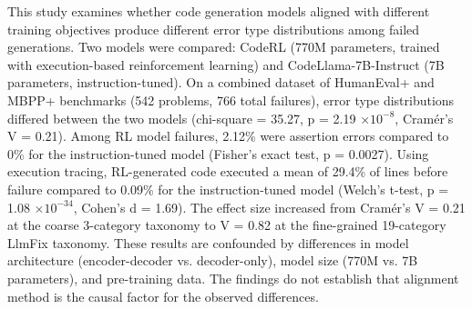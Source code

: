 
This study examines whether code generation models aligned with different training objectives produce different error type distributions among failed generations. Two models were compared: CodeRL (770M parameters, trained with execution-based reinforcement learning) and CodeLlama-7B-Instruct (7B parameters, instruction-tuned). On a combined dataset of HumanEval+ and MBPP+ benchmarks (542 problems, 766 total failures), error type distributions differed between the two models (chi-square = 35.27, p = 2.19 $\times 10^{-8}$, Cramér's V = 0.21). Among RL model failures, 2.12\% were assertion errors compared to 0\% for the instruction-tuned model (Fisher's exact test, p = 0.0027). Using execution tracing, RL-generated code executed a mean of 29.4\% of lines before failure compared to 0.09\% for the instruction-tuned model (Welch's t-test, p = 1.08 $\times 10^{-34}$, Cohen's d = 1.69). The effect size increased from Cramér's V = 0.21 at the coarse 3-category taxonomy to V = 0.82 at the fine-grained 19-category LlmFix taxonomy. These results are confounded by differences in model architecture (encoder-decoder vs. decoder-only), model size (770M vs. 7B parameters), and pre-training data. The findings do not establish that alignment method is the causal factor for the observed differences.
